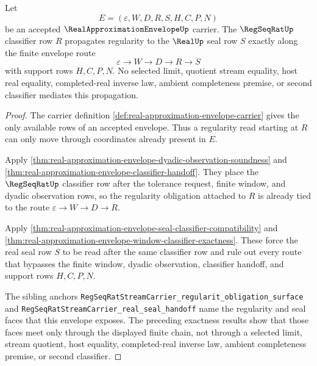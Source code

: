 \begin{theorem}
\label{thm:real-approximation-envelope-regularity-propagation}
Let
$$
E=(\varepsilon,W,D,R,S,H,C,P,N)
$$
be an accepted $\RealApproximationEnvelopeUp$ carrier. The $\RegSeqRatUp$ classifier row $R$ propagates regularity to the $\RealUp$ seal row $S$ exactly along the finite envelope route
$$
\varepsilon \longrightarrow W \longrightarrow D \longrightarrow R \longrightarrow S
$$
with support rows $H,C,P,N$. No selected limit, quotient stream equality, host real equality, completed-real inverse law, ambient completeness premise, or second classifier mediates this propagation.
\end{theorem}
\begin{proof}
The carrier definition \autoref{def:real-approximation-envelope-carrier} gives the only available rows of an accepted envelope. Thus a regularity read starting at $R$ can only move through coordinates already present in $E$.

Apply \autoref{thm:real-approximation-envelope-dyadic-observation-soundness} and \autoref{thm:real-approximation-envelope-classifier-handoff}. They place the $\RegSeqRatUp$ classifier row after the tolerance request, finite window, and dyadic observation rows, so the regularity obligation attached to $R$ is already tied to the route $\varepsilon \to W \to D \to R$.

Apply \autoref{thm:real-approximation-envelope-seal-classifier-compatibility} and \autoref{thm:real-approximation-envelope-window-classifier-exactness}. These force the real seal row $S$ to be read after the same classifier row and rule out every route that bypasses the finite window, dyadic observation, classifier handoff, and support rows $H,C,P,N$.

The sibling anchors \texttt{RegSeqRatStreamCarrier\_regularit\_obligation\_surface} and \texttt{RegSeqRatStreamCarrier\_real\_seal\_handoff} name the regularity and seal faces that this envelope exposes. The preceding exactness results show that those faces meet only through the displayed finite chain, not through a selected limit, stream quotient, host equality, completed-real inverse law, ambient completeness premise, or second classifier.
\end{proof}

